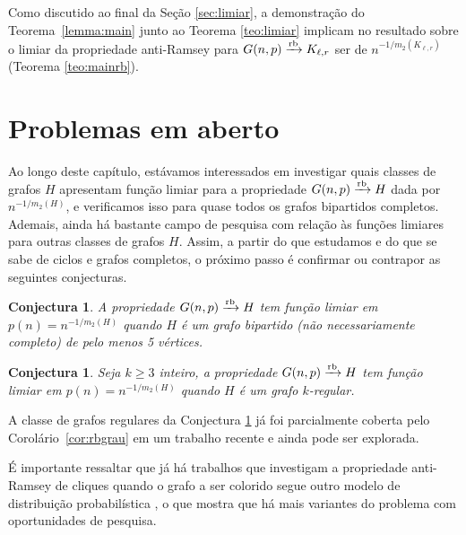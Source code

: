 \documentclass[12pt,a4paper]{book}
\newcommand{\K}{K_{\ell,r}} %
\def\rbarrow{\xrightarrow[]{\raisebox{0.0mm}[0mm]{$\scriptstyle \rm rb$}}}
\newtheorem{conjectura}[teorema] {Conjectura}
\begin{document}
  Como discutido ao final da Seção \ref{sec:limiar}, a demonstração do Teorema~\ref{lemma:main} junto ao %
  Teorema \ref{teo:limiar}
  implicam no resultado sobre o limiar da propriedade anti-Ramsey para $G(n,p) \rbarrow \K$ ser de $n^{-1/m_2(\K)}$ (Teorema \ref{teo:mainrb}).

    
\section{Problemas em aberto}
\label{subsec:bipartido-prob}
Ao longo deste capítulo, estávamos interessados em investigar quais classes de grafos $H$ apresentam função limiar para a propriedade $G(n,p)\rbarrow H$  dada por $n^{-1/m_2(H)}$, 
e verificamos isso para quase todos os grafos bipartidos completos.
Ademais, ainda há bastante campo de pesquisa com relação às funções limiares para outras classes de grafos $H$. 
Assim, a partir do que estudamos e do que se sabe de ciclos e grafos completos, o próximo passo é confirmar ou contrapor as seguintes conjecturas. %



\begin{conjectura}\label{conj:antibipartidos}
     A propriedade $G(n,p)\rbarrow H$ tem função limiar em  $p(n) =  n^{-1/m_2(H)}$ quando $H$ é um grafo bipartido (não necessariamente completo) de pelo menos 5 vértices.
\end{conjectura}

\begin{conjectura}\label{conj:antiregulares}
     Seja $k \geq 3$ inteiro, a propriedade $G(n,p)\rbarrow H$ tem função limiar em  $p(n) =  n^{-1/m_2(H)}$ quando $H$ é um grafo $k$-regular.
\end{conjectura}

A classe de grafos regulares da Conjectura \ref{conj:antiregulares} já foi parcialmente coberta pelo Corolário~\ref{cor:rbgrau} em um trabalho recente \cite{behague2024thresholds} e ainda pode ser explorada.

É importante ressaltar que já há trabalhos  que investigam a propriedade anti-Ramsey de cliques quando o grafo a ser colorido segue outro modelo de distribuição probabilística \cite{aigner2022large, aigner2022small}, o que mostra que há mais variantes do problema com oportunidades de pesquisa.
\end{document}
